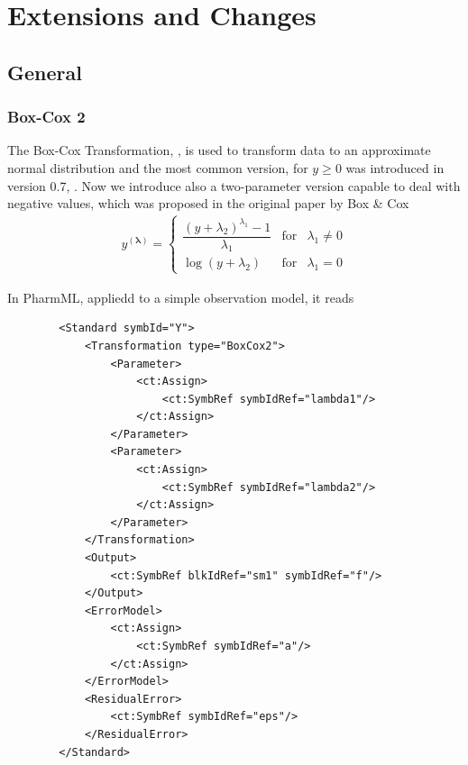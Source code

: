 
\chapter{Extensions and Changes}
\label{ch:otherChanges}



\section{General}

\subsection{Box-Cox 2}
\label{sec:BoxCox2Trafo}

The Box-Cox Transformation, \cite{BoxCox:1964}, is used to transform data to 
an approximate normal distribution and the most common version, for $y \geq 0$ 
was introduced in version 0.7, \cite{Swat:2015b}. Now we introduce 
also a two-parameter version capable to deal with negative values, which was 
proposed in the original paper by Box \& Cox
\begin{align}
y^{(\mathbf{\lambda})} = \left\{ \begin{array}{rcl}  \dfrac{(y+\lambda_2)^{\lambda_1} -1}{\lambda_1} & \mbox{for} & \lambda_1 \neq 0 \\ 
\log(y + \lambda_2) & \mbox{for} & \lambda_1 = 0 \end{array}\right. \label{eq:BC2}
\end{align}

In PharmML, appliedd to a simple observation model, it reads
\lstset{language=XML}
\begin{lstlisting}
        <Standard symbId="Y">
            <Transformation type="BoxCox2">
                <Parameter>
                    <ct:Assign>
                        <ct:SymbRef symbIdRef="lambda1"/>
                    </ct:Assign>
                </Parameter>
                <Parameter>
                    <ct:Assign>
                        <ct:SymbRef symbIdRef="lambda2"/>
                    </ct:Assign>
                </Parameter>
            </Transformation>
            <Output>
                <ct:SymbRef blkIdRef="sm1" symbIdRef="f"/>
            </Output>
            <ErrorModel>
                <ct:Assign>
                    <ct:SymbRef symbIdRef="a"/>
                </ct:Assign>
            </ErrorModel>
            <ResidualError>
                <ct:SymbRef symbIdRef="eps"/>
            </ResidualError>
        </Standard>
\end{lstlisting}

